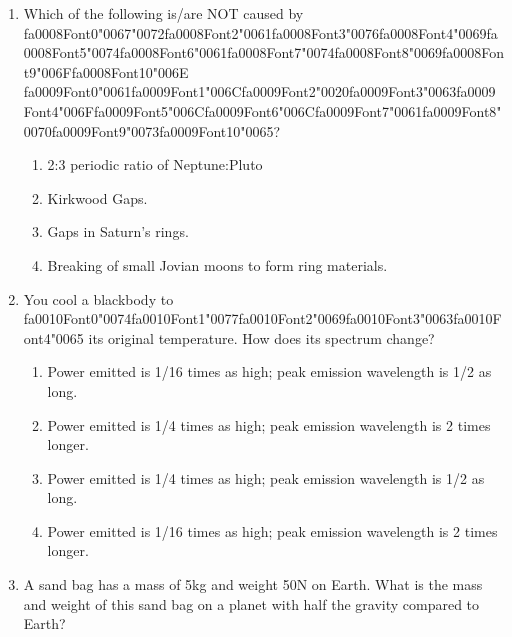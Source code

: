 \documentclass[12pt]{article}
\begin{document}
\begin{enumerate}[label=\arabic*.]
\item Which of the following is/are NOT caused by {\csname fa0008Font0\endcsname\char"0067}{\char"0072}{\csname fa0008Font2\endcsname\char"0061}{\csname fa0008Font3\endcsname\char"0076}{\csname fa0008Font4\endcsname\char"0069}{\csname fa0008Font5\endcsname\char"0074}{\csname fa0008Font6\endcsname\char"0061}{\csname fa0008Font7\endcsname\char"0074}{\csname fa0008Font8\endcsname\char"0069}{\csname fa0008Font9\endcsname\char"006F}{\csname fa0008Font10\endcsname\char"006E} {\csname fa0009Font0\endcsname\char"0061}{\csname fa0009Font1\endcsname\char"006C}{\csname fa0009Font2\endcsname\char"0020}{\csname fa0009Font3\endcsname\char"0063}{\csname fa0009Font4\endcsname\char"006F}{\csname fa0009Font5\endcsname\char"006C}{\csname fa0009Font6\endcsname\char"006C}{\csname fa0009Font7\endcsname\char"0061}{\csname fa0009Font8\endcsname\char"0070}{\csname fa0009Font9\endcsname\char"0073}{\csname fa0009Font10\endcsname\char"0065}?
\begin{enumerate}[label=(\alph*)]
    \item 2:3 periodic ratio of Neptune:Pluto
    \item Kirkwood Gaps.
    \item Gaps in Saturn's rings.
    \item Breaking of small Jovian moons to form ring materials.
\end{enumerate}
\item You cool a blackbody to {\csname fa0010Font0\endcsname\char"0074}{\csname fa0010Font1\endcsname\char"0077}{\csname fa0010Font2\endcsname\char"0069}{\csname fa0010Font3\endcsname\char"0063}{\csname fa0010Font4\endcsname\char"0065} its original temperature. How does its spectrum change?
\begin{enumerate}[label=(\alph*)]
    \item Power emitted is 1/16 times as high; peak emission wavelength is 1/2 as long.
    \item Power emitted is 1/4 times as high; peak emission wavelength is 2 times longer.
    \item Power emitted is 1/4 times as high; peak emission wavelength is 1/2 as long.
    \item Power emitted is 1/16 times as high; peak emission wavelength is 2 times longer.
\end{enumerate}
\item A sand bag has a mass of 5kg and weight 50N on Earth. What is the mass and weight of this
sand bag on a planet with half the gravity compared to Earth?

\end{enumerate}
\end{document}
